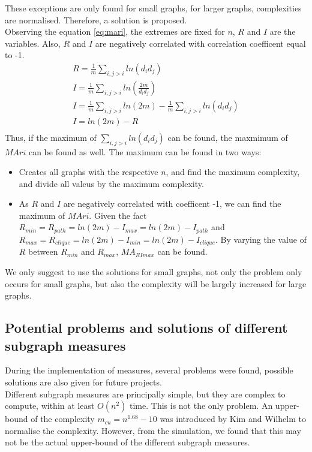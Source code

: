 \documentclass[12pt]{article}
\begin{document}
\noindent
These exceptions are only found for small graphs, for larger graphs, complexities are normalised. Therefore, a solution is proposed.\\
Observing the equation \ref{eq:mari}, the extremes are fixed for $n$, $R$ and $I$ are the variables. Also, $R$ and $I$ are negatively correlated with correlation coefficent equal to -1.\\
\begin{equation}
    \label{eq:ricorrelation}
    \begin{gathered}
        R = \frac{1}{m}\sum_{i,j>i}ln(d_id_j)\\
        I = \frac{1}{m}\sum_{i,j>i}ln(\frac{2m}{d_id_j})\\
        I = \frac{1}{m}\sum_{i,j>i}ln(2m)-\frac{1}{m}\sum_{i,j>i}ln(d_id_j)\\
        I = ln(2m)-R\\
    \end{gathered}
\end{equation}
Thus, if the maximum of $\sum_{i,j>i}ln(d_id_j)$ can be found, the maxmimum of $MAri$ can be found as well. The maximum can be found in two ways:\\
\begin{itemize}
    \item Creates all graphs with the respective $n$, and find the maximum complexity, and divide all valeus by the maximum complexity.
    \item As $R$ and $I$ are negatively correlated with coefficent -1, we can find the maximum of $MAri$. Given the fact $R_{min} = R_{path} = ln(2m)-I_{max} = ln(2m)-I_{path}$ and $R_{max} = R_{clique} = ln(2m)-I_{min} = ln(2m)-I_{clique}$. By varying the value of $R$ between $R_{min}$ and $R_{max}$, $MA_{RImax}$ can be found.
\end{itemize}
We only suggest to use the solutions for small graphs, not only the problem only occurs for small graphs, but also the complexity will be largely increased for large graphs.\\
\subsection{Potential problems and solutions of different subgraph measures}
During the implementation of measures, several problems were found, possible solutions are also given for future projects.\\
Different subgraph measures are principally simple, but they are complex to compute, within at least $O(n^2)$ time\cite{KIM20082637}. This is not the only problem. An upper-bound of the complexity $m_{cu} = n^{1.68}-10$ was introduced by Kim and Wilhelm\cite{KIM20082637} to normalise the complexity. However, from the simulation, we found that this may not be the actual upper-bound of the different subgraph measures.
\end{document}

